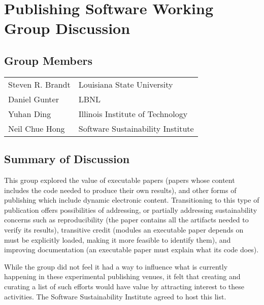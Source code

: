 \section{Publishing Software Working Group Discussion}
\label{sec:appendix_publishing_SW}

\subsection{Group Members}
{\small
\begin{longtable}{ll}
   Steven R. Brandt & Louisiana State University
\\ Daniel Gunter    & LBNL
\\ Yuhan Ding       & Illinois Institute of Technology
\\ Neil Chue Hong   & Software Sustainability Institute
\end{longtable}
}

\subsection{Summary of Discussion}

This group explored the value of executable papers (papers whose content includes
the code needed to produce their own results), and other forms of publishing which
include dynamic electronic content. Transitioning to this type of publication offers
possibilities of addressing, or partially addressing sustainability concerns 
such as reproducibility (the paper contains all the artifacts needed to verify its
results), transitive credit (modules an executable paper depends on must be explicitly
loaded, making it more feasible to identify them), and improving documentation (an executable
paper must explain what its code does).

While the group did not feel it had a way to influence what is currently happening
in these experimental publishing venues, it felt that creating and curating a list of
such efforts would have value by attracting interest to these activities.
The Software Sustainability Institute agreed to host this list.

